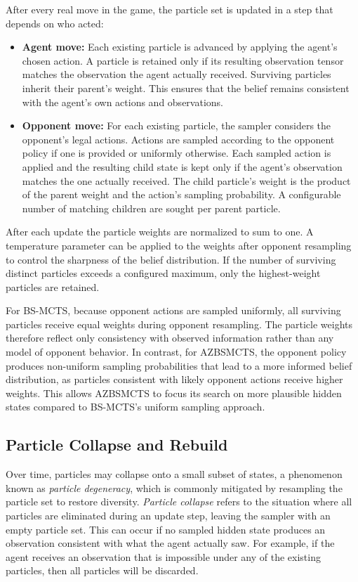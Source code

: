 \documentclass[12pt,oneside,openright]{article}
\begin{document}
After every real move in the game, the particle set is updated in a step that depends on who acted:

\begin{itemize}
  \item \textbf{Agent move:} Each existing particle is advanced by applying the agent's chosen action. A particle is retained only if its resulting observation tensor matches the observation the agent actually received. Surviving particles inherit their parent's weight. This ensures that the belief remains consistent with the agent's own actions and observations.
  \item \textbf{Opponent move:} For each existing particle, the sampler considers the opponent's legal actions. Actions are sampled according to the opponent policy if one is provided or uniformly otherwise. Each sampled action is applied and the resulting child state is kept only if the agent's observation matches the one actually received. The child particle's weight is the product of the parent weight and the action's sampling probability. A configurable number of matching children are sought per parent particle.
\end{itemize}

After each update the particle weights are normalized to sum to one. A temperature parameter can be applied to the weights after opponent resampling to control the sharpness of the belief distribution. If the number of surviving distinct particles exceeds a configured maximum, only the highest-weight particles are retained.

For BS-MCTS, because opponent actions are sampled uniformly, all surviving particles receive equal weights during opponent resampling. The particle weights therefore reflect only consistency with observed information rather than any model of opponent behavior. In contrast, for AZBSMCTS, the opponent policy produces non-uniform sampling probabilities that lead to a more informed belief distribution, as particles consistent with likely opponent actions receive higher weights. This allows AZBSMCTS to focus its search on more plausible hidden states compared to BS-MCTS's uniform sampling approach.

\subsection{Particle Collapse and Rebuild}

Over time, particles may collapse onto a small subset of states, a phenomenon known as \emph{particle degeneracy}, which is commonly mitigated by resampling the particle set to restore diversity.
\emph{Particle collapse} refers to the situation where all particles are eliminated during an update step, leaving the sampler with an empty particle set. \cite{Arulampalam2002tutorial}
This can occur if no sampled hidden state produces an observation consistent with what the agent actually saw. For example, if the agent receives an observation that is impossible under any of the existing particles, then all particles will be discarded.
\end{document}
